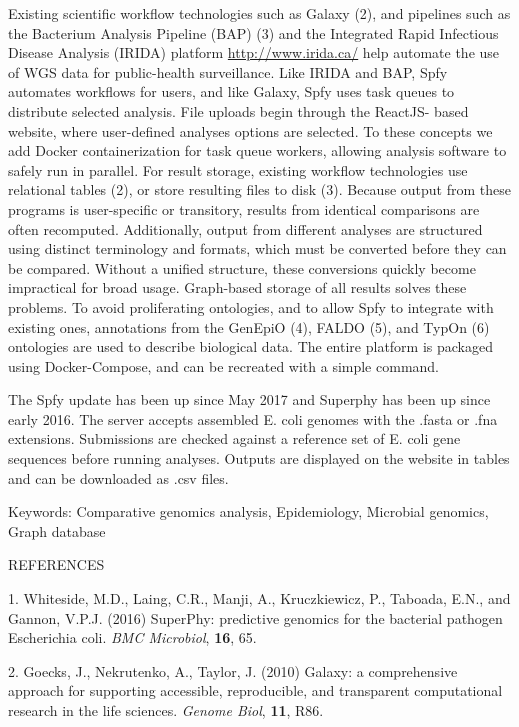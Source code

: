 \documentclass{article}
\begin{document}
Existing scientific workflow technologies such as Galaxy (2), and pipelines such as the Bacterium Analysis Pipeline (BAP) (3) and the Integrated Rapid Infectious Disease Analysis (IRIDA) platform \url{http://www.irida.ca/} help automate the use of WGS data for public-health surveillance. Like IRIDA and BAP, Spfy automates workflows for users, and like Galaxy, Spfy uses task queues to distribute selected analysis. File uploads begin through the ReactJS- based website, where user-defined analyses options are selected. To these concepts we add Docker containerization for task queue workers, allowing analysis software to safely run in parallel. For result storage, existing workflow technologies use relational tables (2), or store resulting files to disk (3). Because output from these programs is user-specific or transitory, results from identical comparisons are often recomputed. Additionally, output from different analyses are structured using distinct terminology and formats, which must be converted before they can be compared. Without a unified structure, these conversions quickly become impractical for broad usage. Graph-based storage of all results solves these problems. To avoid proliferating ontologies, and to allow Spfy to integrate with existing ones, annotations from the GenEpiO (4), FALDO (5), and TypOn (6) ontologies are used to describe biological data. The entire platform is packaged using Docker-Compose, and can be recreated with a simple command.

The Spfy update has been up since May 2017 and Superphy has been up since early 2016. The server accepts assembled E. coli genomes with the .fasta or .fna extensions. Submissions are checked against a reference set of E. coli gene sequences before running analyses. Outputs are displayed on the website in tables and can be downloaded as .csv files.

Keywords: Comparative genomics analysis, Epidemiology, Microbial genomics, Graph database

\newpage

REFERENCES

1.
Whiteside, M.D., Laing, C.R., Manji, A., Kruczkiewicz, P., Taboada, E.N., and Gannon, V.P.J. (2016)
SuperPhy: predictive genomics for the bacterial pathogen Escherichia coli.
\textit{BMC Microbiol}, \textbf{16}, 65.

2.
Goecks, J., Nekrutenko, A., Taylor, J. (2010)
Galaxy: a comprehensive approach for supporting accessible, reproducible, and transparent computational research in the life sciences.
\textit{Genome Biol}, \textbf{11}, R86.
\end{document}
